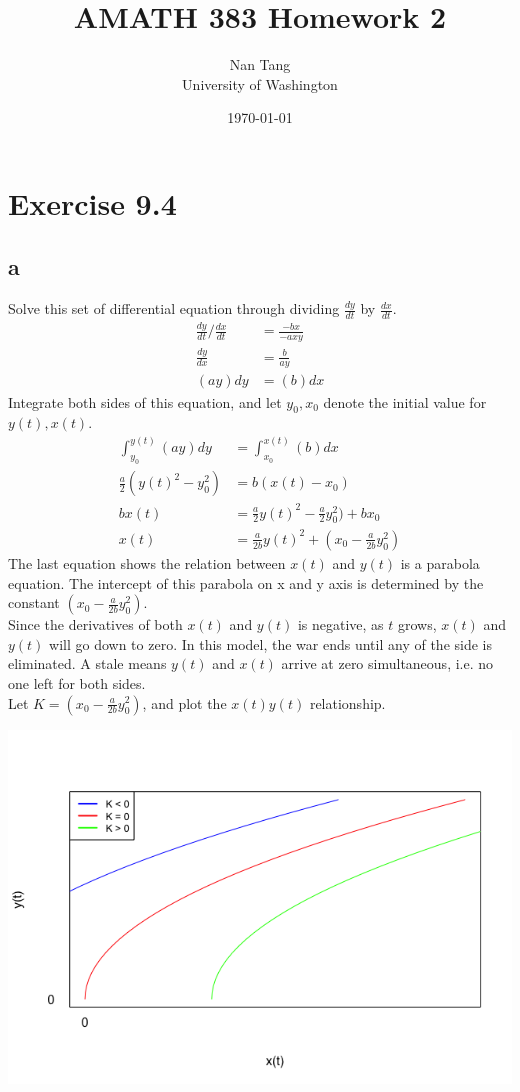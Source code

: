\documentclass[11pt,letterpaper]{article}
\title{AMATH 383 Homework 2}
\author{Nan Tang \\ University of Washington}
\date{\today}
\begin{document}
\maketitle

\section*{Exercise 9.4}
\subsection*{a}
Solve this set of differential equation through dividing $\frac{dy}{dt}$ by $\frac{dx}{dt}$. 
\begin{align*}
\frac{dy}{dt} / \frac{dx}{dt} &= \frac{-bx}{-axy} \\
\frac{dy}{dx} &= \frac{b}{ay} \\
(ay )dy &=( b) dx 
\end{align*}
\noindent Integrate both sides of this equation, and let $y_0, x_0$ denote the initial value for $y(t), x(t)$.
\begin{align*}
\int_{y_0}^{y(t)}( ay )dy &= \int_{x_0}^{x(t)}( b )dx \\
\frac{a}{2}( y(t)^2 - y_0^2) &= b(x(t) - x_0) \\
b x(t) &= \frac{a}{2} y(t)^2  - \frac{a}{2} y_0^2) + bx_0\\
x(t) &= \frac{a}{2b} y(t)^2 + (x_0 - \frac{a}{2b} y_0^2)
\end{align*}
\noindent The last equation shows the relation between $x(t)$ and $y(t)$ is a parabola equation. The intercept of this parabola on x and y axis is determined by the constant $(x_0 - \frac{a}{2b} y_0^2)$. \\

\noindent Since the derivatives of both $x(t)$ and $y(t)$ is negative, as $t$ grows, $x(t)$ and $y(t)$ will go down to zero. In this model, the war ends until any of the side is eliminated. A stale means $y(t)$ and $x(t)$ arrive at zero simultaneous, i.e. no one left for both sides. \\

\noindent Let $K = (x_0 - \frac{a}{2b} y_0^2)$, and plot the $x(t)y(t)$ relationship. 

\includegraphics[scale=0.6]{1-a-1.png}
\end{document}
